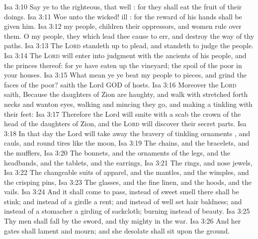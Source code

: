 \vs Isa 3:10 Say ye to the righteous, that  well : for they shall eat the fruit of their doings.
\vs Isa 3:11 Woe unto the wicked!  ill : for the reward of his hands shall be given him.
\vs Isa 3:12  my people, children  their oppressors, and women rule over them. O my people, they which lead thee cause  to err, and destroy the way of thy paths.
\vs Isa 3:13 The \textsc{Lord} standeth up to plead, and standeth to judge the people.
\vs Isa 3:14 The \textsc{Lord} will enter into judgment with the ancients of his people, and the princes thereof: for ye have eaten up the vineyard; the spoil of the poor  in your houses.
\vs Isa 3:15 What mean ye  ye beat my people to pieces, and grind the faces of the poor? saith the Lord GOD of hosts.
\vs Isa 3:16 Moreover the \textsc{Lord} saith, Because the daughters of Zion are haughty, and walk with stretched forth necks and wanton eyes, walking and mincing  they go, and making a tinkling with their feet:
\vs Isa 3:17 Therefore the Lord will smite with a scab the crown of the head of the daughters of Zion, and the \textsc{Lord} will discover their secret parts.
\vs Isa 3:18 In that day the Lord will take away the bravery of  tinkling ornaments , and  cauls, and  round tires like the moon,
\vs Isa 3:19 The chains, and the bracelets, and the mufflers,
\vs Isa 3:20 The bonnets, and the ornaments of the legs, and the headbands, and the tablets, and the earrings,
\vs Isa 3:21 The rings, and nose jewels,
\vs Isa 3:22 The changeable suits of apparel, and the mantles, and the wimples, and the crisping pins,
\vs Isa 3:23 The glasses, and the fine linen, and the hoods, and the vails.
\vs Isa 3:24 And it shall come to pass,  instead of sweet smell there shall be stink; and instead of a girdle a rent; and instead of well set hair baldness; and instead of a stomacher a girding of sackcloth;  burning instead of beauty.
\vs Isa 3:25 Thy men shall fall by the sword, and thy mighty in the war.
\vs Isa 3:26 And her gates shall lament and mourn; and she  desolate shall sit upon the ground.
